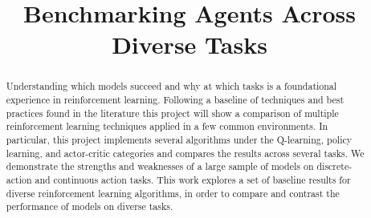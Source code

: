 \documentclass[conference]{IEEEtran}
\begin{document}
\title{Benchmarking Agents Across Diverse Tasks}

\author{

\and


\and


\and


\and

}

\maketitle

\begin{abstract}
    Understanding which models succeed and why at which tasks is a foundational experience in reinforcement learning.
    Following a baseline of techniques and best practices found in the literature this project will show a comparison of multiple reinforcement learning techniques applied in a few common environments.
    In particular, this project implements several algorithms under the Q-learning, policy learning, and actor-critic categories and compares the results across several tasks.
    We demonstrate the strengths and weaknesses of a large sample of models on discrete-action and continuous action tasks.
    This work explores a set of baseline results for diverse reinforcement learning algorithms, in order to compare and contrast the performance of models on diverse tasks.
\end{abstract}
\end{document}
